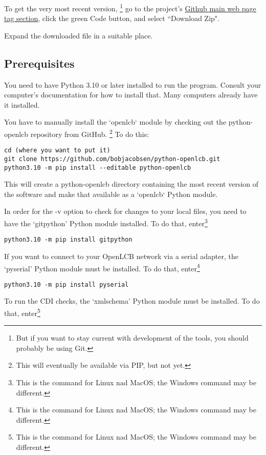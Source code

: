 To get the very most recent version,
\footnote{But if you want to stay current with development of the tools, you should probably be using Git.}
go to the project's
\href{https://github.com/bobjacobsen/OlcbChecker}{Github main web page tag section},
click the green Code button, and select ``Download Zip".

Expand the downloaded file in a suitable place.

\subsection{Prerequisites}

You need to have Python 3.10 or later installed to run the program. Consult your
computer's documentation for how to install that.  Many computers already
have it installed.

You have to manually install the `openlcb` module by checking out the
python-openlcb repository from GitHub.
\footnote{This will eventually be available via PIP, but not yet.}
To do this:
\begin{verbatim}
cd (where you want to put it)
git clone https://github.com/bobjacobsen/python-openlcb.git
python3.10 -m pip install --editable python-openlcb
\end{verbatim}
This will create a python-openlcb directory containing the most recent version of the software
and make that available as a `openlcb` Python module.

In order for the -v option to check for changes to your local files, 
you need to have the `gitpython' Python module installed. To do that,
enter\footnote{This is the command for Linux nad MacOS; the Windows command may be different.}

\begin{verbatim}
python3.10 -m pip install gitpython
\end{verbatim}

If you want to connect to your OpenLCB network via a serial adapter, 
the `pyserial' Python module must be installed. To do that,
enter\footnote{This is the command for Linux nad MacOS; the Windows command may be different.}

\begin{verbatim}
python3.10 -m pip install pyserial
\end{verbatim}

To run the CDI checks, the `xmlschema' Python module must be installed. To do that,
enter\footnote{This is the command for Linux nad MacOS; the Windows command may be different.}

